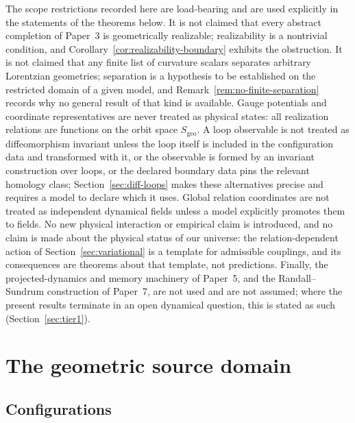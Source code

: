 \documentclass[11pt,a4paper]{article}
\theoremstyle{plain}
\theoremstyle{definition}
\theoremstyle{remark}
\newcommand{\Sgeo}{S_{\mathrm{geo}}}
\begin{document}
The scope restrictions recorded here are load-bearing and are used explicitly in the statements
of the theorems below. It is not claimed that every abstract completion of Paper~3 is
geometrically realizable; realizability is a nontrivial condition, and
Corollary~\ref{cor:realizability-boundary} exhibits the obstruction. It is not claimed that any
finite list of curvature scalars separates arbitrary Lorentzian geometries; separation is a
hypothesis to be established on the restricted domain of a given model, and
Remark~\ref{rem:no-finite-separation} records why no general result of that kind is available.
Gauge potentials and coordinate representatives are never treated as physical states: all
realization relations are functions on the orbit space $\Sgeo$. A loop observable is not treated
as diffeomorphism invariant unless the loop itself is included in the configuration data and
transformed with it, or the observable is formed by an invariant construction over loops, or the
declared boundary data pins the relevant homology class; Section~\ref{sec:diff-loops} makes these
alternatives precise and requires a model to declare which it uses. Global relation coordinates
are not treated as independent dynamical fields unless a model explicitly promotes them to
fields. No new physical interaction or empirical claim is introduced, and no claim is made about
the physical status of our universe: the relation-dependent action of
Section~\ref{sec:variational} is a template for admissible couplings, and its consequences are
theorems about that template, not predictions. Finally, the projected-dynamics and memory
machinery of Paper~5, and the Randall--Sundrum construction of Paper~7, are not used and are not
assumed; where the present results terminate in an open dynamical question, this is stated as
such (Section~\ref{sec:tier1}).

\section{The geometric source domain}
\label{sec:source}

\subsection{Configurations}
\end{document}
